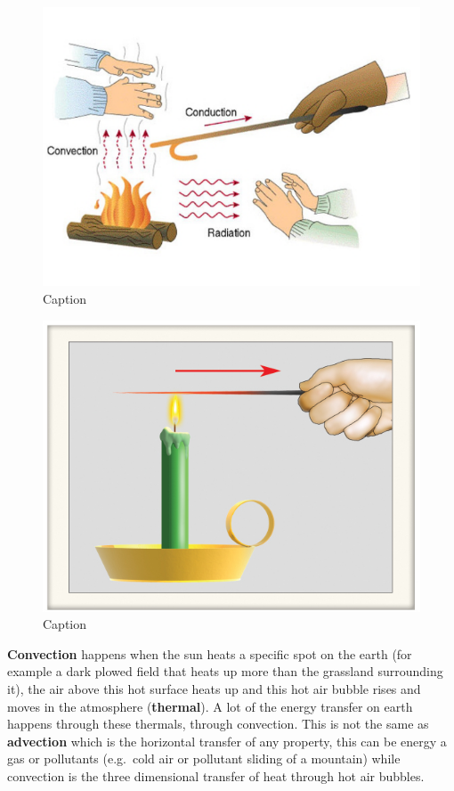 \documentclass[12pt,oneside]{book}
\begin{document}
\begin{figure}

{\centering \includegraphics[width=0.5\linewidth]{figures/Figure117} 

}

\caption{Caption}\label{fig:Heattransfer}
\end{figure}

\begin{figure}

{\centering \includegraphics[width=0.5\linewidth]{figures/Figure118} 

}

\caption{Caption}\label{fig:Heattransfer2}
\end{figure}

\textbf{Convection} happens when the sun heats a specific spot on the
earth (for example a dark plowed field that heats up more than the
grassland surrounding it), the air above this hot surface heats up and
this hot air bubble rises and moves in the atmosphere
(\textbf{thermal}). A lot of the energy transfer on earth happens
through these thermals, through convection. This is not the same as
\textbf{advection} which is the horizontal transfer of any property,
this can be energy a gas or pollutants (e.g.~cold air or pollutant
sliding of a mountain) while convection is the three dimensional
transfer of heat through hot air bubbles.
\end{document}
